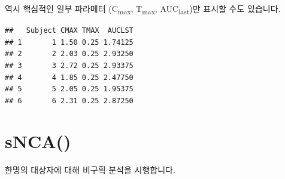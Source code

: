 \documentclass[9pt,]{krantz}
\newenvironment{Shaded}{\begin{snugshade}}{\end{snugshade}}
\newcommand{\CommentTok}[1]{\textcolor[rgb]{0.56,0.35,0.01}{\textit{#1}}}
\newcommand{\DataTypeTok}[1]{\textcolor[rgb]{0.13,0.29,0.53}{#1}}
\newcommand{\DecValTok}[1]{\textcolor[rgb]{0.00,0.00,0.81}{#1}}
\newcommand{\KeywordTok}[1]{\textcolor[rgb]{0.13,0.29,0.53}{\textbf{#1}}}
\newcommand{\NormalTok}[1]{#1}
\newcommand{\OperatorTok}[1]{\textcolor[rgb]{0.81,0.36,0.00}{\textbf{#1}}}
\newcommand{\StringTok}[1]{\textcolor[rgb]{0.31,0.60,0.02}{#1}}
\begin{document}
역시 핵심적인 일부 파라메터 (C\textsubscript{max}, T\textsubscript{max}, AUC\textsubscript{last})만 표시할 수도 있습니다.

\begin{Shaded}
\end{Shaded}

\begin{verbatim}
##   Subject CMAX TMAX  AUCLST
## 1       1 1.50 0.25 1.74125
## 2       2 2.03 0.25 2.93250
## 3       3 2.72 0.25 2.93375
## 4       4 1.85 0.25 2.47750
## 5       5 2.05 0.25 1.95375
## 6       6 2.31 0.25 2.87250
\end{verbatim}

\hypertarget{snca}{%
\section{sNCA()}\label{snca}}

한명의 대상자에 대해 비구획 분석을 시행합니다.

\begin{Shaded}
\end{Shaded}
\end{document}
